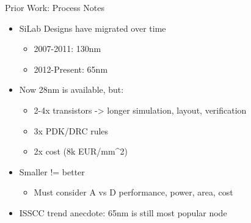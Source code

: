 \begin{frame}{Prior Work: Process Notes}
\protect\hypertarget{prior-work-process-notes}{}
\begin{itemize}
\tightlist
\item
  SiLab Designs have migrated over time

  \begin{itemize}
  \tightlist
  \item
    2007-2011: 130nm
  \item
    2012-Present: 65nm
  \end{itemize}
\item
  Now 28nm is available, but:

  \begin{itemize}
  \tightlist
  \item
    2-4x transistors -\textgreater{} longer simulation, layout,
    verification
  \item
    3x PDK/DRC rules
  \item
    2x cost (8k EUR/mm\^{}2)
  \end{itemize}
\item
  Smaller != better

  \begin{itemize}
  \tightlist
  \item
    Must consider A vs D performance, power, area, cost
  \end{itemize}
\item
  ISSCC trend anecdote: 65nm is still most popular node
\end{itemize}
\end{frame}

